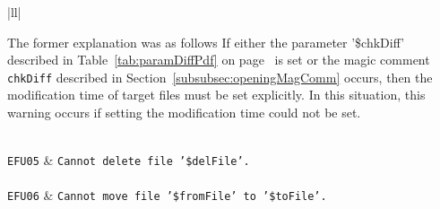 \begin{longtable}{|ll|}
{\begin{minipage}{0.95\linewidth}
The former explanation was as follows
If either the parameter '\$chkDiff' described in Table~\ref{tab:paramDiffPdf} 
on page~\pageref{tab:paramDiffPdf} is set 
or the magic comment \texttt{chkDiff} 
described in Section~\ref{subsubsec:openingMagComm} occurs, 
then the modification time of target files must be set explicitly. 
In this situation, this warning occurs if setting the modification time could not be set. 
\end{minipage}
} \\
\texttt{\footnotesize EFU05} 
& \texttt{\footnotesize Cannot delete file '\$delFile'. } \\
 \\
\texttt{\footnotesize EFU06} 
& \texttt{\footnotesize Cannot move file '\$fromFile' to '\$toFile'. } \\
 \\
\end{longtable}


